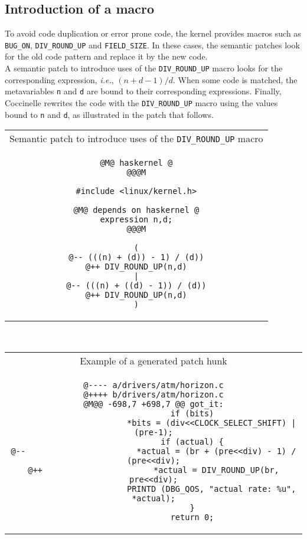 \newpage
\subsection{Introduction of a macro}

To avoid code duplication or error prone code, the kernel provides
macros such as \texttt{BUG\_ON}, \texttt{DIV\_ROUND\_UP} and
\texttt{FIELD\_SIZE}. In these cases, the semantic patches look for
the old code pattern and replace it by the new code.\\

A semantic patch to introduce uses of the \texttt{DIV\_ROUND\_UP} macro
looks for the corresponding expression, \emph{i.e.}, $(n + d - 1) /
d$. When some code is matched, the metavariables \texttt{n} and \texttt{d}
are bound to their corresponding expressions. Finally, Coccinelle rewrites
the code with the \texttt{DIV\_ROUND\_UP} macro using the values bound to
\texttt{n} and \texttt{d}, as illustrated in the patch that follows.\\

\begin{tabular}{c}
Semantic patch to introduce uses of the \texttt{DIV\_ROUND\_UP} macro\\
\begin{lstlisting}[language=Cocci,name=divround]
@M@ haskernel @
@@@M

#include <linux/kernel.h>

@M@ depends on haskernel @
expression n,d;
@@@M

(
@-- (((n) + (d)) - 1) / (d))
@++ DIV_ROUND_UP(n,d)
|
@-- (((n) + ((d) - 1)) / (d))
@++ DIV_ROUND_UP(n,d)
)
\end{lstlisting}
\end{tabular}\\

\vspace{1cm}

\begin{tabular}{c}
Example of a generated patch hunk\\
\begin{lstlisting}[language=PatchC]
@---- a/drivers/atm/horizon.c
@++++ b/drivers/atm/horizon.c
@M@@ -698,7 +698,7 @@ got_it:
                if (bits)
                        *bits = (div<<CLOCK_SELECT_SHIFT) | (pre-1);
                if (actual) {
@--                       *actual = (br + (pre<<div) - 1) / (pre<<div);
@++                       *actual = DIV_ROUND_UP(br, pre<<div);
                        PRINTD (DBG_QOS, "actual rate: %u", *actual);
                }
                return 0;
\end{lstlisting}
\end{tabular}\\

